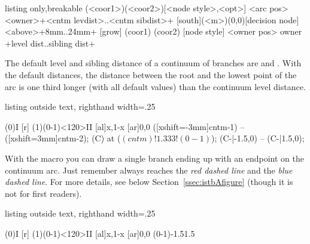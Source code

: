 \begin{tcblisting}{listing only,breakable}
  (<coor1>)(<coor2>)[<node style>,<opt>]%
               <arc pos>{<owner>}+<cntm levdist>..<cntm sibdist>+
  [south](<m>)(0,0)[decision node]<above>{}+8mm..24mm+
  [grow] %
  (coor1) %
  (coor2) %
  [node style] %
  <owner pos> %
  {owner} %
  +level dist..sibling dist+ %
\end{tcblisting}

The default level and sibling distance of a continuum of branches are \xw{8mm} and .
With the default distances, the distance between the root and the lowest point of the arc is one third longer (with all default values) than the continuum level distance.

\begin{tcblisting}{listing outside text, righthand width=.25\linewidth}
\begin{istgame}[scale=1.2]
\istrootcntmA(0){I}  [r]  \endist
\xtdistance{10mm}{20mm}
\istroot(1)(0-1)<120>{II}
  [al]{x,1-x}  [ar]{0,0}  \endist
{} 
      ([xshift=-3mm]cntm-1) -- ([xshift=3mm]cntm-2);
\coordinate (C) at ($(cntm)!1.333!(0-1)$);
 (C-|{-1.5,0}) -- (C-|{1.5,0});
\end{istgame}
\end{tcblisting}

With the macro \icmd{\istbA} you can draw a single branch ending up with an endpoint on the continuum arc.
Just remember \cmd{\istb} always reaches the \emph{red dashed line} and \cmd{\istbA} the \emph{blue dashed line}.
For more details, see below Section~\ref{ssec:istbAfigure} (though it is not for first readers).

\begin{tcblisting}{listing outside text, righthand width=.25\linewidth}
\begin{istgame}[scale=1.2]
\istrootcntmA(0){I}
  [r]  \endist
\xtdistance{10mm}{20mm}
\istroot(1)(0-1)<120>{II}
  [al]{x,1-x}  [ar]{0,0}  \endist
{}(0-1){-1.5}{1.5}
\end{istgame}
\end{tcblisting}


